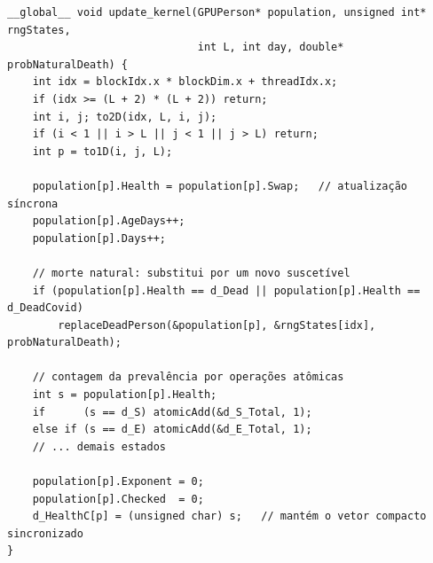 \begin{lstlisting}[caption={Atualização síncrona, substituição e contagem por operações atômicas.}, label={lst:updatekernel}]
__global__ void update_kernel(GPUPerson* population, unsigned int* rngStates,
                              int L, int day, double* probNaturalDeath) {
    int idx = blockIdx.x * blockDim.x + threadIdx.x;
    if (idx >= (L + 2) * (L + 2)) return;
    int i, j; to2D(idx, L, i, j);
    if (i < 1 || i > L || j < 1 || j > L) return;
    int p = to1D(i, j, L);

    population[p].Health = population[p].Swap;   // atualização síncrona
    population[p].AgeDays++;
    population[p].Days++;

    // morte natural: substitui por um novo suscetível
    if (population[p].Health == d_Dead || population[p].Health == d_DeadCovid)
        replaceDeadPerson(&population[p], &rngStates[idx], probNaturalDeath);

    // contagem da prevalência por operações atômicas
    int s = population[p].Health;
    if      (s == d_S) atomicAdd(&d_S_Total, 1);
    else if (s == d_E) atomicAdd(&d_E_Total, 1);
    // ... demais estados

    population[p].Exponent = 0;
    population[p].Checked  = 0;
    d_HealthC[p] = (unsigned char) s;   // mantém o vetor compacto sincronizado
}
\end{lstlisting}
